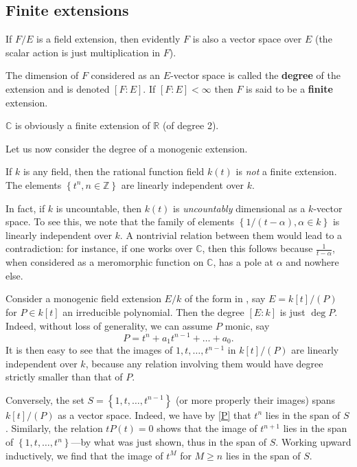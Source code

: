 \subsection{Finite extensions}
If
$F/E$ is a field extension,  then evidently  $F$ is also a vector space over $E$
(the scalar action is just multiplication in $F$). 

\begin{definition} 
The dimension of $F$
considered as an $E$-vector space is called the \textbf{degree} of the extension and is
denoted $[F:E]$. If $[F:E]<\infty$ then $F$ is said to be a
\textbf{finite} extension.
\end{definition} 

\begin{example} 
$\mathbb{C}$ is obviously a finite extension of $\mathbb{R}$ (of degree 2).
\end{example} 

Let us now consider the degree of a monogenic extension.

\begin{example} 
If $k$ is any field, then the rational function field $k(t)$ is \emph{not} a
finite extension. The elements $\left\{t^n, n \in \mathbb{Z}\right\}$
are linearly independent over $k$.

In fact, if $k$ is uncountable, then $k(t)$ is \emph{uncountably} dimensional
as a $k$-vector space. To see this, we note that the family of elements
$\left\{1/(t- \alpha), \alpha \in k\right\}$ is linearly independent over $k$. A
nontrivial relation between them would lead to a contradiction: for instance,
if one works over $\mathbb{C}$, then this follows because
$\frac{1}{t-\alpha}$, when considered as a meromorphic function on
$\mathbb{C}$, has a pole at $\alpha$ and nowhere else.
\end{example} 

\begin{example} 
Consider a monogenic  field extension $E/k$ of the form in
, say $E = k[t]/(P)$ for $P \in k[t]$ an irreducible
polynomial.
Then the degree $[E:k]$ is just $\deg P$. 
Indeed, without loss of generality, we can assume $P$ monic, say
\begin{equation} \label{P} P = t^n + a_1 t^{n-1} + \dots + a_0.\end{equation}
It is then easy to see that the images of $1, t, \dots, t^{n-1}$ in
$k[t]/(P)$ are linearly
independent over $k$, because any relation involving them would have
degree strictly smaller than that of $P$.

Conversely, the set $S=\left\{1, t, \dots, t^{n-1}\right\}$ (or more
properly their images) spans $k[t]/(P)$ as a vector space.
Indeed, we have by \eqref{P} that $t^n$ lies in the span of $S$.
Similarly, the relation $tP(t)=0$ shows that the image of  $t^{n+1}$ lies in the span of
$\left\{1, t, \dots, t^n\right\}$---by what was just shown, thus in the span of
$S$. Working upward inductively, we find
that the image of $t^M$ for $M  \geq n$ lies in the span of $S$.
\end{example} 


